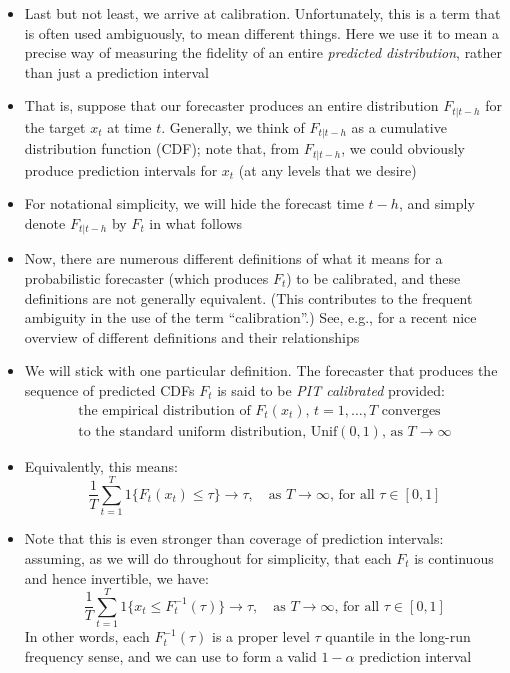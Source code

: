 \documentclass{article}
\begin{document}
\begin{itemize}
\item Last but not least, we arrive at calibration. Unfortunately, this is a
  term that is often used ambiguously, to mean different things. Here we use  it
  to mean a precise way of measuring the fidelity of an entire \emph{predicted
    distribution}, rather than just a prediction interval  

\item That is, suppose that our forecaster produces an entire distribution
  $F_{t|t-h}$ for the target $x_t$ at time $t$. Generally, we think of
  $F_{t|t-h}$ as a cumulative distribution function (CDF); note that, from
  $F_{t|t-h}$, we could obviously produce prediction intervals for $x_t$ (at any
  levels that we desire)

\item For notational simplicity, we will hide the forecast time $t-h$, and
  simply denote $F_{t|t-h}$ by $F_t$ in what follows

\item Now, there are numerous different definitions of what it means for a
  probabilistic forecaster (which produces $F_t$) to be calibrated, and these
  definitions are not generally equivalent. (This contributes to the frequent
  ambiguity in the use of the term ``calibration''.) See, e.g.,
  \citet{gneiting2022regression} for a recent nice overview of different
  definitions and their relationships

\item We will stick with one particular definition. The forecaster that produces
  the sequence of predicted CDFs $F_t$ is said to be \emph{PIT calibrated}
  provided:  
  \begin{multline*}
  \text{the empirical distribution of $F_t(x_t)$, $t = 1,\dots,T$ converges} \\ 
  \text{to the standard uniform distribution, $\mathrm{Unif}(0,1)$, as $T \to
  \infty$} 
  \end{multline*}

\item Equivalently, this means:  
  \[
  \frac{1}{T} \sum_{t=1}^T 1\{ F_t(x_t) \leq \tau \} \to \tau, \quad \text{as $T
    \to \infty$, for all $\tau \in [0,1]$} 
  \]

\item Note that this is even stronger than coverage of prediction intervals:
  assuming, as we will do throughout for simplicity, that each $F_t$ is
  continuous and hence invertible, we have:
  \[
  \frac{1}{T} \sum_{t=1}^T 1\{ x_t \leq F^{-1}_t(\tau) \} \to \tau, \quad
  \text{as $T \to \infty$, for all $\tau \in [0,1]$} 
  \]
  In other words, each $F^{-1}_t(\tau)$ is a proper level $\tau$ quantile in the
  long-run frequency sense, and we can use  to form a valid $1-\alpha$ prediction interval 


\end{itemize}
\end{document}
